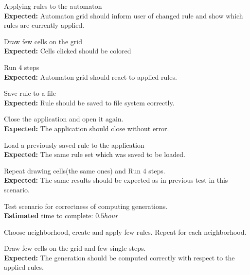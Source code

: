 \documentclass{article}
\begin{document}
\begin{legal}
\begin{legal}
		\item Applying rules to the automaton
		\\{\bf Expected:} Automaton grid should inform user of changed rule and show which rules are currently applied.

		\item Draw few cells on the grid
		\\{\bf Expected:} Cells clicked should be colored 
				
		\item Run 4 steps
		\\{\bf Expected:} Automaton grid should react to applied rules.
		
		\item Save rule to a file
		\\{\bf Expected:} Rule should be saved to file system correctly.

		\item Close the application and open it again.
		\\{\bf Expected:} The application should close without error.
		
		\item Load a previously saved rule to the application
		\\{\bf Expected:} The same rule set which was saved to be loaded.
		
		\item Repeat drawing cells(the same ones) and Run 4 steps.
		\\{\bf Expected:} The same results should be expected as in previous test in this scenario.


	\end{legal}
	
	\item Test scenario for correctness of computing generations.
	\\ {\bf Estimated} time to complete: $0.5 hour$
	\begin{legal}
		\item Choose neighborhood, create and apply few rules.
		Repeat for each neighborhood.
		
		\item Draw few cells on the grid and few single steps.
		\\{\bf Expected:} The generation should be computed correctly with respect to the applied rules.

	\end{legal}

\end{legal}
\end{document}
